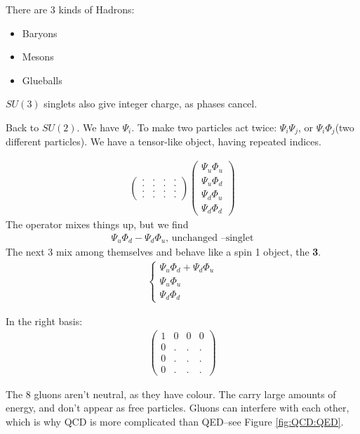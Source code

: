 \documentclass[]{article}
\begin{document}
There are 3 kinds of Hadrons:
\begin{itemize}
	\item Baryons
	\item Mesons
	\item Glueballs
\end{itemize}

$SU(3)$ singlets also give integer charge, as phases cancel.

Back to $SU(2)$. We have $\Psi_i$. To make two particles act twice: $\Psi_i\Psi_j$, or $\Psi_i\Phi_j$(two different particles). We have a tensor-like object, having repeated indices.

\begin{align*}
	\begin{pmatrix}
		.&.&.&.\\
		.&.&.&.\\
		.&.&.&.\\
		.&.&.&.
	\end{pmatrix} 	\begin{pmatrix}
\Psi_u\Phi_u\\
\Psi_u\Phi_d\\
\Psi_d\Phi_u\\
\Psi_d\Phi_d
\end{pmatrix} 
\end{align*}
 The operator mixes things up, but we find
\begin{align*}
    \Psi_u\Phi_d-\Psi_d\Phi_u \text{, unchanged --singlet}	
\end{align*}
The next 3 mix among themselves and behave like a spin 1 object, the {\bfseries 3}.
\begin{align*}
	\begin{cases}
		\Psi_u\Phi_d+\Psi_d\Phi_u\\
		\Psi_u\Phi_u\\
		\Psi_d\Phi_d
	\end{cases}
\end{align*}

In the right basis:
\begin{align*}
	\begin{pmatrix}
		1&0&0&0\\
		0&.&.&.\\
		0&.&.&.\\
		0&.&.&.
	\end{pmatrix}
\end{align*}



The 8 gluons aren't neutral, as they have colour. The carry large amounts of energy, and don't appear as free particles. Gluons can interfere with each other, which is why QCD is more complicated than QED--see Figure \ref{fig:QCD:QED}.
 
\end{document}
